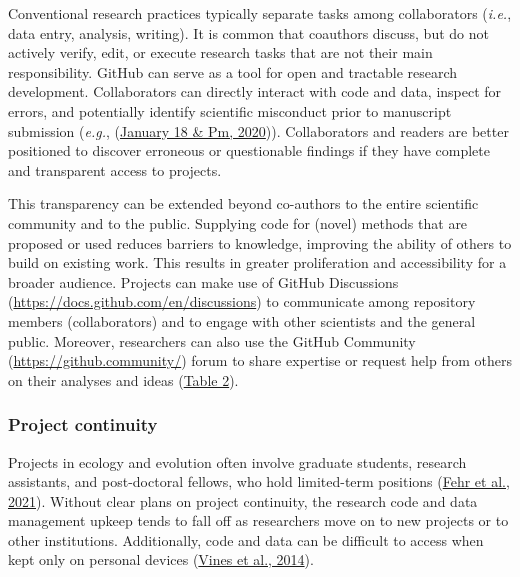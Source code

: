 Conventional research practices typically separate tasks among collaborators (\emph{i.e.}, data entry, analysis, writing).
It is common that coauthors discuss, but do not actively verify, edit, or execute research tasks that are not their main responsibility.
GitHub can serve as a tool for open and tractable research development.
Collaborators can directly interact with code and data, inspect for errors, and potentially identify scientific misconduct prior to manuscript submission (\emph{e.g.}, (\protect\hyperlink{ref-18PTmKJkq}{January 18 \& Pm, 2020})).
Collaborators and readers are better positioned to discover erroneous or questionable findings if they have complete and transparent access to projects.

This transparency can be extended beyond co-authors to the entire scientific community and to the public.
Supplying code for (novel) methods that are proposed or used reduces barriers to knowledge, improving the ability of others to build on existing work.
This results in greater proliferation and accessibility for a broader audience.
Projects can make use of GitHub Discussions (\url{https://docs.github.com/en/discussions}) to communicate among repository members (collaborators) and to engage with other scientists and the general public.
Moreover, researchers can also use the GitHub Community (\url{https://github.community/}) forum to share expertise or request help from others on their analyses and ideas (\protect\hyperlink{tbl:roles}{Table 2}).

\hypertarget{project-continuity}{%
\subsubsection{Project continuity}\label{project-continuity}}

Projects in ecology and evolution often involve graduate students, research assistants, and post-doctoral fellows, who hold limited-term positions (\protect\hyperlink{ref-D4C4k4ak}{Fehr et al., 2021}).
Without clear plans on project continuity, the research code and data management upkeep tends to fall off as researchers move on to new projects or to other institutions.
Additionally, code and data can be difficult to access when kept only on personal devices (\protect\hyperlink{ref-19kmNxiHc}{Vines et al., 2014}).

